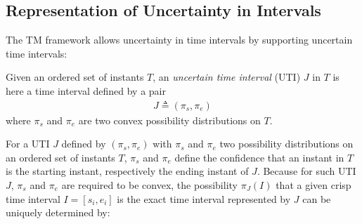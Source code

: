 



\subsection{\label{subsec:tm-interval}Representation of Uncertainty in Intervals}
The TM framework allows uncertainty in time intervals by supporting uncertain time intervals:

\begin{definition}
Given an ordered set of instants $T$, an \emph{uncertain time interval} (UTI) $J$ in $T$ is here a time interval defined by a pair
\begin{align}
J \triangleq (\pi_s, \pi_e)
\end{align}
where $\pi_s$ and $\pi_e$ are two convex possibility distributions on $T$.
\end{definition}

For a UTI $J$ defined by $(\pi_s, \pi_e)$ with $\pi_s$ and $\pi_e$ two possibility distributions on an ordered set of instants $T$, $\pi_s$ and $\pi_e$ define the confidence that an instant in $T$ is the starting instant, respectively the ending instant of $J$. Because for such UTI $J$, $\pi_s$ and $\pi_e$ are required to be convex, the possibility $\pi_J(I)$ that a given crisp time interval $I = \left[s_i, e_i\right]$ is the exact time interval represented by $J$ can be uniquely determined by:

